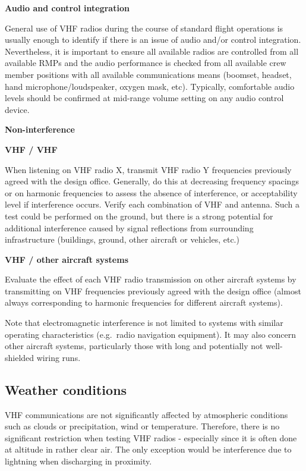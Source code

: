 \documentclass[
]{book}
\begin{document}
\textbf{Audio and control integration}

General use of VHF radios during the course of standard flight operations is
usually enough to identify if there is an issue of audio and/or control
integration. Nevertheless, it is important to ensure all available radios are
controlled from all available RMPs and the audio performance is checked from
all available crew member positions with all available communications means
(boomset, headset, hand microphone/loudspeaker, oxygen mask, etc). Typically,
comfortable audio levels should be confirmed at mid-range volume setting on any
audio control device.

\textbf{Non-interference}

\textbf{VHF / VHF}

When listening on VHF radio X, transmit VHF radio Y frequencies previously
agreed with the design office. Generally, do this at decreasing frequency
spacings or on harmonic frequencies to assess the absence of interference, or
acceptability level if interference occurs. Verify each combination of VHF and
antenna. Such a test could be performed on the ground, but there is a strong
potential for additional interference caused by signal reflections from
surrounding infrastructure (buildings, ground, other aircraft or vehicles,
etc.)

\textbf{VHF / other aircraft systems}

Evaluate the effect of each VHF radio transmission on other aircraft systems by
transmitting on VHF frequencies previously agreed with the design office
(almost always corresponding to harmonic frequencies for different aircraft
systems).

Note that electromagnetic interference is not limited to systems with similar
operating characteristics (e.g.~radio navigation equipment). It may also
concern other aircraft systems, particularly those with long and potentially
not well-shielded wiring runs.

\hypertarget{weather-conditions}{%
\subsection{Weather conditions}\label{weather-conditions}}

VHF communications are not significantly affected by atmospheric conditions
such as clouds or precipitation, wind or temperature. Therefore, there is no
significant restriction when testing VHF radios - especially since it is often
done at altitude in rather clear air. The only exception would be interference
due to lightning when discharging in proximity.
\end{document}
